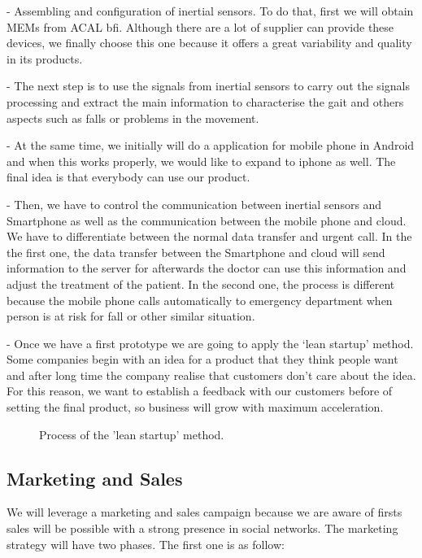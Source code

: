 -	Assembling and configuration of inertial sensors. To do that, first we will obtain MEMs from ACAL bfi. Although there are a lot of supplier can provide these devices, we finally choose this one because it offers a great variability and quality in its products.

-	The next step is to use the signals from inertial sensors to carry out the signals processing and extract the main information to characterise the gait and others aspects such as falls or problems in the movement.

-	At the same time, we initially will do a application for mobile phone in Android and when this works properly, we would like to expand to iphone as well. The final idea is that everybody can use our product.

-	Then, we have to control the communication between inertial sensors and Smartphone as well as the communication between the mobile phone and cloud. We have to differentiate between the normal data transfer and urgent call. In the the first one, the data transfer between the Smartphone and cloud will send information to the server for afterwards the doctor can use this information and adjust the treatment of the patient. In the second one, the process is different because the mobile phone calls automatically to emergency department when person is at risk for fall or other similar situation.

-	Once we have a first prototype we are going to apply the ‘lean startup’ method. Some companies begin with an idea for a product that they think people want and after long time the company realise that customers don’t care about the idea. For this reason, we want to establish a feedback with our customers before of setting the final product, so  business will grow with maximum acceleration.

\begin{figure}[H]
	\centering
	\caption{Process of the 'lean startup' method.}
	\label{fig:leanstartup_diagram}
\end{figure}

\subsection{Marketing and Sales}
We will leverage a marketing and sales campaign because we are aware of firsts sales will be possible with a strong presence in social networks. The marketing strategy will have two phases. The first one is as follow:

